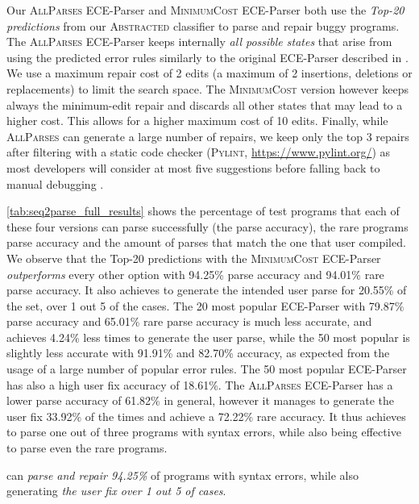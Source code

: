 Our \textsc{AllParses} ECE-Parser and \textsc{MinimumCost} ECE-Parser both use
the \emph{Top-20 predictions} from our \textsc{Abstracted} classifier to parse
and repair buggy programs. The \textsc{AllParses} ECE-Parser keeps internally
\emph{all possible states} that arise from using the predicted error rules
similarly to the original ECE-Parser described in \citep{Aho_1972}. We use a
maximum repair cost of 2 edits (\ie a maximum of 2 insertions, deletions or
replacements) to limit the search space. The \textsc{MinimumCost} version
however keeps always the minimum-edit repair and discards all other states that
may lead to a higher cost. This allows for a higher maximum cost of 10 edits.
Finally, while \textsc{AllParses} can generate a large number of repairs, we
keep only the top 3 repairs after filtering with a static code checker
(\textsc{Pylint}, \url{https://www.pylint.org/}) as most developers will
consider at most five suggestions before falling back to manual debugging
\citep{Kochhar2016-oc, Parnin2011-ce}.

\autoref{tab:seq2parse_full_results} shows the percentage of test programs that
each of these four versions can parse successfully (\ie the parse accuracy), the
rare programs parse accuracy and the amount of parses that match the one that
user compiled. We observe that the Top-20 predictions with the
\textsc{MinimumCost} ECE-Parser \emph{outperforms} every other option with
94.25\% parse accuracy and 94.01\% rare parse accuracy. It also achieves to
generate the intended user parse for 20.55\% of the set, \ie over 1 out 5 of the
cases. The 20 most popular ECE-Parser with 79.87\% parse accuracy and 65.01\%
rare parse accuracy is much less accurate, and achieves 4.24\% less times to
generate the user parse, while the 50 most popular is slightly less accurate
with 91.91\% and 82.70\% accuracy, as expected from the usage of a large number
of popular error rules. The 50 most popular ECE-Parser has also a high user fix
accuracy of 18.61\%. The \textsc{AllParses} ECE-Parser has a lower parse
accuracy of 61.82\% in general, however it manages to generate the user fix
33.92\% of the times and achieve a 72.22\% rare accuracy. It thus achieves to
parse one out of three programs with syntax errors, while also being effective
to parse even the rare programs.

\begin{framed}
  \noindent \toolname can \emph{parse and repair 94.25\%} of programs with
  syntax errors, while also generating \emph{the user fix over 1 out 5 of
  cases}.
\end{framed}

